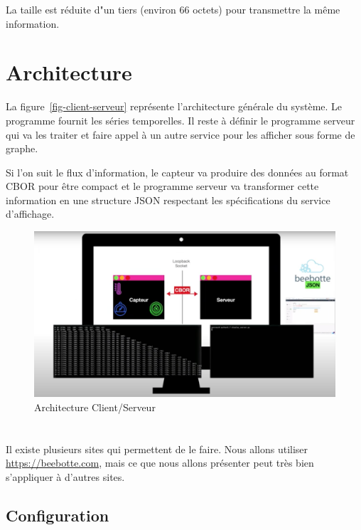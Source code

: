 La taille est réduite d"un tiers (environ 66 octets) pour transmettre la même information.

\section{Architecture}

La figure~\vref{fig-client-serveur} représente l'architecture générale du système. Le programme  fournit les séries temporelles. Il reste à définir le programme serveur qui va les traiter et faire appel à un autre service pour les afficher sous forme de graphe. 

       \vspace{1em}


Si l'on suit le flux d'information, le capteur va produire des données au format CBOR pour être compact et le programme serveur va transformer cette information en une structure JSON respectant les spécifications du service d'affichage.

\begin{figure}[tbp]
\centerline{\includegraphics[width=1\columnwidth]{Pictures/Capture40.png}}
\caption{Architecture Client/Serveur}
\label{fig-client-serveur}
\end{figure}

\section{}

Il existe plusieurs sites qui permettent de le faire. Nous allons utiliser \url{https://beebotte.com}, mais ce que nous allons présenter peut très bien s'appliquer à d'autres sites.

\subsection{Configuration}

